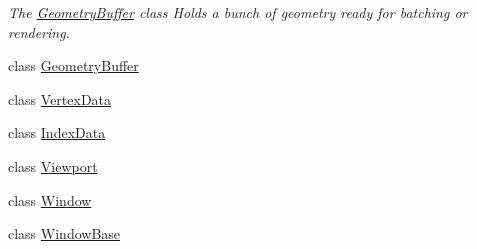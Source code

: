 \begin{DoxyCompactItemize}
\begin{DoxyCompactList}\small\item\em The \hyperlink{classkglt_1_1_geometry_buffer}{Geometry\-Buffer} class Holds a bunch of geometry ready for batching or rendering. \end{DoxyCompactList}\item 
class \hyperlink{classkglt_1_1_geometry_buffer}{Geometry\-Buffer}
\item 
class \hyperlink{classkglt_1_1_vertex_data}{Vertex\-Data}
\item 
class \hyperlink{classkglt_1_1_index_data}{Index\-Data}
\item 
class \hyperlink{classkglt_1_1_viewport}{Viewport}
\item 
class \hyperlink{classkglt_1_1_window}{Window}
\item 
class \hyperlink{classkglt_1_1_window_base}{Window\-Base}
\end{DoxyCompactItemize}
